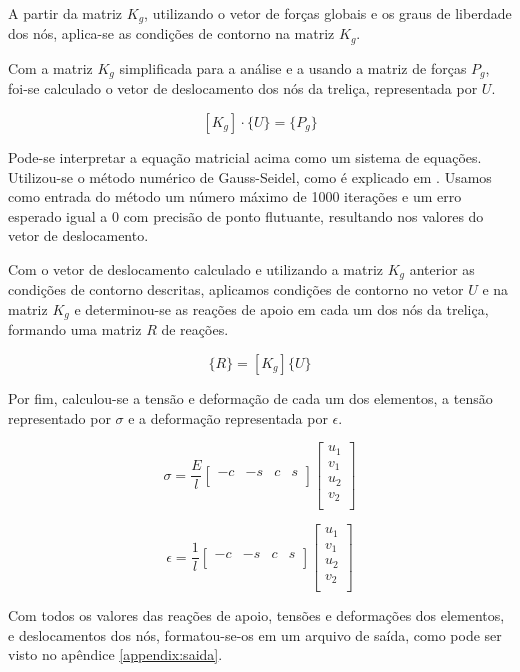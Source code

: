 \documentclass[paper=a4, fontsize=11pt]{scrartcl}
\begin{document}
A partir da matriz \(K_g\), utilizando o vetor de forças globais e os graus de liberdade dos nós, aplica-se as condições de contorno na matriz \(K_g\).

Com a matriz \(K_g\) simplificada para a análise e a usando a matriz de forças \(P_g\), foi-se calculado o vetor de deslocamento dos nós da treliça, representada por \(U\).

\[[K_g]\cdot\{U\} = \{P_g\}\]

Pode-se interpretar a equação matricial acima como um sistema de equações. Utilizou-se o método numérico de Gauss-Seidel, como é explicado em \cite{gauss_seidel}. Usamos como entrada do método um número máximo de 1000 iterações e um erro esperado igual a 0 com precisão de ponto flutuante, resultando nos valores do vetor de deslocamento.

Com o vetor de deslocamento calculado e utilizando a matriz \(K_g\) anterior as condições de contorno descritas, aplicamos condições de contorno no vetor \(U\) e na matriz \(K_g\) e determinou-se as reações de apoio em cada um dos nós da treliça, formando uma matriz \(R\) de reações.

\[\{R\} = [K_g] \{U\}\]

Por fim, calculou-se a tensão e deformação de cada um dos elementos, a tensão representado por \(\sigma\) e a deformação representada por \(\epsilon\).

\[\sigma = \frac{E}{l}  
\begin{bmatrix}
-c & -s & c & s\\
\end{bmatrix}
\begin{bmatrix}
u_1 \\
v_1 \\
u_2 \\
v_2 \\
\end{bmatrix}
\]


\[\epsilon = \frac{1}{l}  
\begin{bmatrix}
-c & -s & c & s\\
\end{bmatrix}
\begin{bmatrix}
u_1 \\
v_1 \\
u_2 \\
v_2 \\
\end{bmatrix}
\]

Com todos os valores das reações de apoio, tensões e deformações dos elementos, e deslocamentos dos nós, formatou-se-os em um arquivo de saída, como pode ser visto no apêndice \ref{appendix:saida}. 
\end{document}
